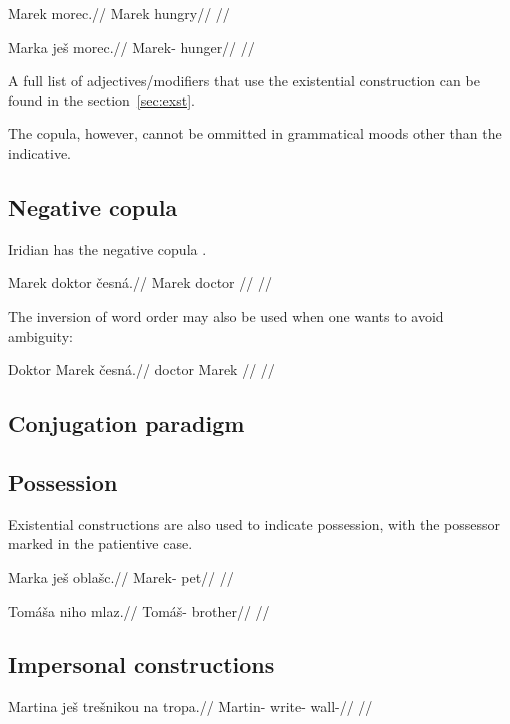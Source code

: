 \pex
\begingl
\gla *Marek morec.//
\glb Marek hungry//
\glft {}//
\endgl
\xe


\pex
\begingl
\gla Marka je\v{s} morec.//
\glb Marek-  hunger//
\glft {}//
\endgl
\xe

A full list of adjectives/modifiers that use the existential construction can be found in the section~\ref{sec:exst}.

The copula, however, cannot be ommitted in grammatical moods other than the indicative.

\subsection{Negative copula}

Iridian has the negative copula .

\pex
\begingl
\gla Marek doktor \v{c}esná.//
\glb Marek doctor //
\glft {}//
\endgl
\xe

\par The inversion of word order may also be used when one wants to avoid ambiguity:

\pex
\begingl
\gla Doktor Marek \v{c}esná.//
\glb doctor Marek //
\glft {}//
\endgl
\xe


\subsection{Conjugation paradigm}


\subsection{Possession}
Existential constructions are also used to indicate possession, with the possessor marked in the patientive case.

\pex
\begingl
\gla Marka je\v{s} obla\v{s}c.//
\glb Marek-  pet//
\glft {}//
\endgl
\xe

\pex
\begingl
\gla Tom\'a\v{s}a niho mlaz.//
\glb Tom\'a\v{s}-  brother//
\glft {}//
\endgl
\xe

\subsection{Impersonal constructions}
\pex
\begingl
\gla Martina je\v{s} tre\v{s}nikou na tropa.//
\glb Martin-  write-  wall-//
\glft {}//
\endgl
\xe

